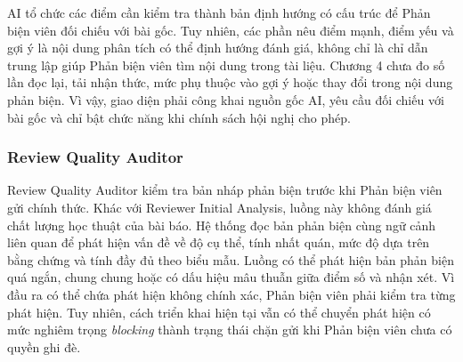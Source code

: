 AI tổ chức các điểm cần kiểm tra thành bản định hướng có cấu trúc để Phản biện viên đối chiếu với bài gốc. Tuy nhiên, các phần nêu điểm mạnh, điểm yếu và gợi ý là nội dung phân tích có thể định hướng đánh giá, không chỉ là chỉ dẫn trung lập giúp Phản biện viên tìm nội dung trong tài liệu. Chương 4 chưa đo số lần đọc lại, tải nhận thức, mức phụ thuộc vào gợi ý hoặc thay đổi trong nội dung phản biện. Vì vậy, giao diện phải công khai nguồn gốc AI, yêu cầu đối chiếu với bài gốc và chỉ bật chức năng khi chính sách hội nghị cho phép.

\subsubsection{Review Quality Auditor}

Review Quality Auditor kiểm tra bản nháp phản biện trước khi Phản biện viên gửi chính thức. Khác với Reviewer Initial Analysis, luồng này không đánh giá chất lượng học thuật của bài báo. Hệ thống đọc bản phản biện cùng ngữ cảnh liên quan để phát hiện vấn đề về độ cụ thể, tính nhất quán, mức độ dựa trên bằng chứng và tính đầy đủ theo biểu mẫu. Luồng có thể phát hiện bản phản biện quá ngắn, chung chung hoặc có dấu hiệu mâu thuẫn giữa điểm số và nhận xét. Vì đầu ra có thể chứa phát hiện không chính xác, Phản biện viên phải kiểm tra từng phát hiện. Tuy nhiên, cách triển khai hiện tại vẫn có thể chuyển phát hiện có mức nghiêm trọng \textit{blocking} thành trạng thái chặn gửi khi Phản biện viên chưa có quyền ghi đè.

